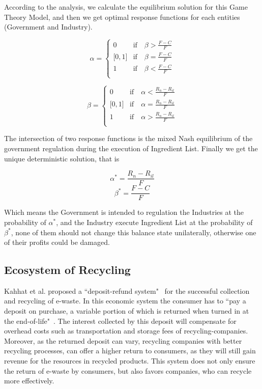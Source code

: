 According to the \cite{chenlihong} analysis, we calculate the equilibrium solution for this Game Theory Model, 
and then we get optimal response functions for each entities (Government and Industry).

\begin{equation}
\alpha = \left\{
\begin{array}{ll}
0 & \text{if} \quad \beta > \frac{F-C}{F} \\
\lbrack 0, 1 \rbrack & \text{if} \quad \beta = \frac{F-C}{F} \\
1 & \text{if} \quad \beta < \frac{F-C}{F} \\
\end{array}
\right.
\end{equation}

\begin{equation}
\beta = \left\{
\begin{array}{ll}
0 & \text{if} \quad \alpha < \frac{R_n-R_{il}}{F} \\
\lbrack 0, 1 \rbrack & \text{if} \quad \alpha = \frac{R_n-R_{il}}{F} \\
1 & \text{if} \quad \alpha > \frac{R_n-R_{il}}{F} \\
\end{array}
\right.
\end{equation}


The intersection of two response functions is the mixed Nash equilibrium of the government regulation 
during the execution of Ingredient List. Finally we get the unique deterministic solution, that is 

\[
\alpha^* = \frac{R_n - R_{il}}{F}
\]
\[
\beta^* =  \frac{F - C}{F}
\]

Which means the Government is intended to regulation the Industries at the probability of $\alpha^*$, 
and the Industry execute Ingredient List at the probability of $\beta^*$, none of them should not 
change this balance state unilaterally, otherwise one of their profits could be damaged.
 
\subsection{Ecosystem of Recycling}
Kahhat et al. proposed a ``deposit-refund system"~\cite{kahhat2008exploring} for the successful collection and 
recycling of e-waste. In this economic system the consumer has to 
``pay a deposit on purchase, a variable portion of which is returned when turned in at the end-of-life"~\cite{plambeck2009effects}. 
The interest collected by this deposit will compensate for overhead costs such as transportation 
and storage fees of recycling-companies. Moreover, as the returned deposit can vary, 
recycling companies with better recycling processes, can offer a higher return to consumers, 
as they will still gain revenue for the resources in recycled products. 
This system does not only ensure the return of e-waste by consumers, 
but also favors companies, who can recycle more effectively.

